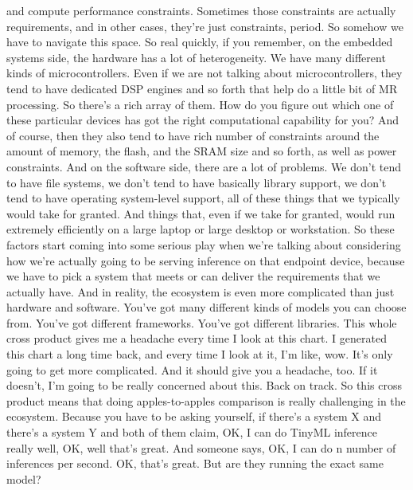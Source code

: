 {{{{{{{    and compute performance constraints.
    Sometimes those constraints are actually requirements, and in other cases,
    they're just constraints, period.
    So somehow we have to navigate this space.
    So real quickly, if you remember, on the embedded systems side,
    the hardware has a lot of heterogeneity.
    We have many different kinds of microcontrollers.
    Even if we are not talking about microcontrollers,
    they tend to have dedicated DSP engines and so forth that help
    do a little bit of MR processing.
    So there's a rich array of them.
    How do you figure out which one of these particular devices
    has got the right computational capability for you?
    And of course, then they also tend to have
    rich number of constraints around the amount of memory,
    the flash, and the SRAM size and so forth, as well as power constraints.
    And on the software side, there are a lot of problems.
    We don't tend to have file systems, we don't
    tend to have basically library support, we
    don't tend to have operating system-level support,
    all of these things that we typically would take for granted.
    And things that, even if we take for granted,
    would run extremely efficiently on a large laptop or large desktop
    or workstation.
    So these factors start coming into some serious play when
    we're talking about considering how we're actually
    going to be serving inference on that endpoint device,
    because we have to pick a system that meets or can deliver
    the requirements that we actually have.
    And in reality, the ecosystem is even more complicated
    than just hardware and software.
    You've got many different kinds of models you can choose from.
    You've got different frameworks.
    You've got different libraries.
    This whole cross product gives me a headache every time
    I look at this chart.
    I generated this chart a long time back, and every time I look at it,
    I'm like, wow.
    It's only going to get more complicated.
    And it should give you a headache, too.
    If it doesn't, I'm going to be really concerned about this.
    Back on track.
    So this cross product means that doing apples-to-apples comparison
    is really challenging in the ecosystem.
    Because you have to be asking yourself, if there's a system X
    and there's a system Y and both of them claim,
    OK, I can do TinyML inference really well, OK, well that's great.
    And someone says, OK, I can do n number of inferences per second.
    OK, that's great.
    But are they running the exact same model?
}}}}}}}
